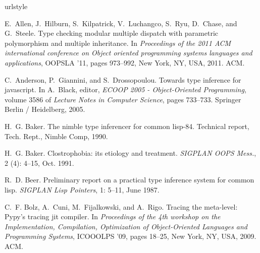 \documentclass[9pt]{sigplanconf}
\begin{document}
\begin{thebibliography}{27}
\softraggedright

\providecommand{\natexlab}[1]{#1}
\providecommand{\url}[1]{\texttt{#1}}
\expandafter\ifx\csname urlstyle\endcsname\relax
  \providecommand{\doi}[1]{doi: #1}\else
  \providecommand{\doi}{doi: \begingroup \urlstyle{rm}\Url}\fi

E.~Allen, J.~Hilburn, S.~Kilpatrick, V.~Luchangco, S.~Ryu, D.~Chase, and
  G.~Steele.
\newblock Type checking modular multiple dispatch with parametric polymorphism
  and multiple inheritance.
\newblock In \emph{Proceedings of the 2011 ACM international conference on
  Object oriented programming systems languages and applications}, OOPSLA '11,
  pages 973--992, New York, NY, USA, 2011. ACM.

C.~Anderson, P.~Giannini, and S.~Drossopoulou.
\newblock Towards type inference for javascript.
\newblock In A.~Black, editor, \emph{ECOOP 2005 - Object-Oriented Programming},
  volume 3586 of \emph{Lecture Notes in Computer Science}, pages 733--733.
  Springer Berlin / Heidelberg, 2005.

H.~G. Baker.
\newblock The nimble type inferencer for common lisp-84.
\newblock Technical report, Tech. Rept., Nimble Comp, 1990.

H.~G. Baker.
\newblock Clostrophobia: its etiology and treatment.
\newblock \emph{SIGPLAN OOPS Mess.}, 2 (4): 4--15, Oct. 1991.

R.~D. Beer.
\newblock Preliminary report on a practical type inference system for common
  lisp.
\newblock \emph{SIGPLAN Lisp Pointers}, 1: 5--11, June 1987.

C.~F. Bolz, A.~Cuni, M.~Fijalkowski, and A.~Rigo.
\newblock Tracing the meta-level: Pypy's tracing jit compiler.
\newblock In \emph{Proceedings of the 4th workshop on the Implementation,
  Compilation, Optimization of Object-Oriented Languages and Programming
  Systems}, ICOOOLPS '09, pages 18--25, New York, NY, USA, 2009. ACM.


\end{thebibliography}
\end{document}
